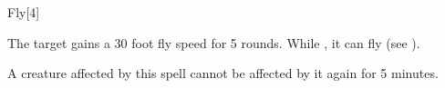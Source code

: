 \begin{spellsection}{Fly}[4]
    \begin{spellheader}
    \end{spellheader}
    \begin{spellcontent}
        \begin{spelltargetinginfo}
        \end{spelltargetinginfo}
        \begin{spelleffects}
            \spelleffect The target gains a 30 foot fly speed for 5 rounds.
            While , it can fly (see ).
        \end{spelleffects}
    \end{spellcontent}
    \begin{spellfooter}
        \spellnotes A creature affected by this spell cannot be affected by it again for 5 minutes.
        \miscastexplode
    \end{spellfooter}
    \begin{spellaugments}
    \end{spellaugments}
\end{spellsection}

